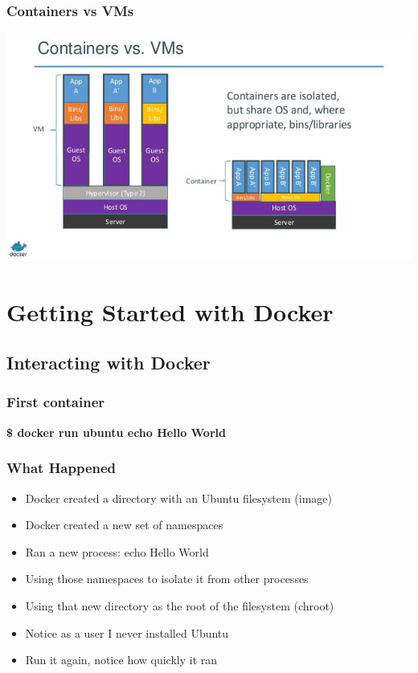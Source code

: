 \documentclass[aspectratio=169,11pt,hyperref={colorlinks=true}]{beamer}
\begin{document}
\begin{frame}
    \frametitle{Containers vs VMs}
    \centering
    \includegraphics[width=.9\textwidth]{containers-vs-vm.jpg}

\end{frame}

\section{Getting Started with Docker}
\subsection{Interacting with Docker}
\begin{frame}
    \frametitle{First container}
    \textbf{\$ docker run ubuntu echo Hello World} \\
\end{frame}

\begin{frame}
    \frametitle{What Happened}
    \begin{itemize}
        \item Docker created a directory with an Ubuntu filesystem (image)
        \item Docker created a new set of namespaces
        \item Ran a new process: echo Hello World
        \item Using those namespaces to isolate it from other processes
        \item Using that new directory as the root of the filesystem (chroot)
        \item Notice as a user I never installed Ubuntu
        \item Run it again, notice how quickly it ran
    \end{itemize}
\end{frame}
\end{document}
